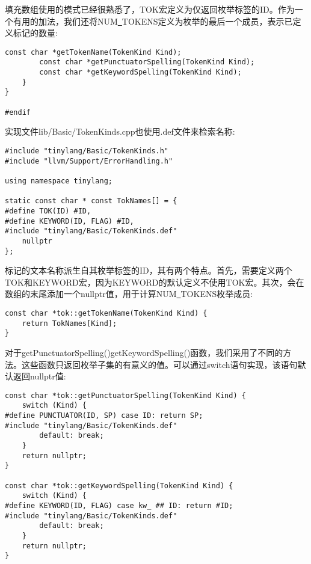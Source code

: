 填充数组使用的模式已经很熟悉了，TOK宏定义为仅返回枚举标签的ID。作为一个有用的加法，我们还将NUM\underline{~}TOKENS定义为枚举的最后一个成员，表示已定义标记的数量:\par

\begin{lstlisting}[caption={}]
		const char *getTokenName(TokenKind Kind);
		const char *getPunctuatorSpelling(TokenKind Kind);
		const char *getKeywordSpelling(TokenKind Kind);
	}
}

#endif
\end{lstlisting}

实现文件lib/Basic/TokenKinds.cpp也使用.def文件来检索名称:\par

\begin{lstlisting}[caption={}]
#include "tinylang/Basic/TokenKinds.h"
#include "llvm/Support/ErrorHandling.h"

using namespace tinylang;

static const char * const TokNames[] = {
#define TOK(ID) #ID,
#define KEYWORD(ID, FLAG) #ID,
#include "tinylang/Basic/TokenKinds.def"
	nullptr
};
\end{lstlisting}

标记的文本名称派生自其枚举标签的ID，其有两个特点。首先，需要定义两个TOK和KEYWORD宏，因为KEYWORD的默认定义不使用TOK宏。其次，会在数组的末尾添加一个nullptr值，用于计算NUM\underline{~}TOKENS枚举成员:\par

\begin{lstlisting}[caption={}]
const char *tok::getTokenName(TokenKind Kind) {
	return TokNames[Kind];
}
\end{lstlisting}

对于getPunctuatorSpelling()getKeywordSpelling()函数，我们采用了不同的方法。这些函数只返回枚举子集的有意义的值。可以通过switch语句实现，该语句默认返回nullptr值:\par

\begin{lstlisting}[caption={}]
const char *tok::getPunctuatorSpelling(TokenKind Kind) {
	switch (Kind) {
#define PUNCTUATOR(ID, SP) case ID: return SP;
#include "tinylang/Basic/TokenKinds.def"
		default: break;
	}
	return nullptr;
}

const char *tok::getKeywordSpelling(TokenKind Kind) {
	switch (Kind) {
#define KEYWORD(ID, FLAG) case kw_ ## ID: return #ID;
#include "tinylang/Basic/TokenKinds.def"
		default: break;
	}
	return nullptr;
}
\end{lstlisting}


